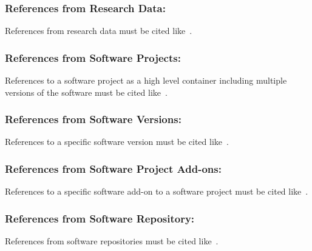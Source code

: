 \documentclass{isprs} %
\begin{document}
\subsubsection{References from Research Data:}
References from research data must be cited like~\cite{dubayah2013}.

\subsubsection{References from Software Projects:}
References to a software project as a high level container including multiple versions of the software must be cited like~\cite{grass2017}.

\subsubsection{References from Software Versions:}
References to a specific software version must be cited like~\cite{grass2015}.

\subsubsection{References from Software Project Add-ons:}
References to a specific software add-on to a software project must be cited like~\cite{lennert2017}.

\subsubsection{References from Software Repository:}
References from software repositories must be cited like~\cite{gago2016}. 

{
	\begin{spacing}{1.17}
		\normalsize
	\end{spacing}
}
\end{document}
